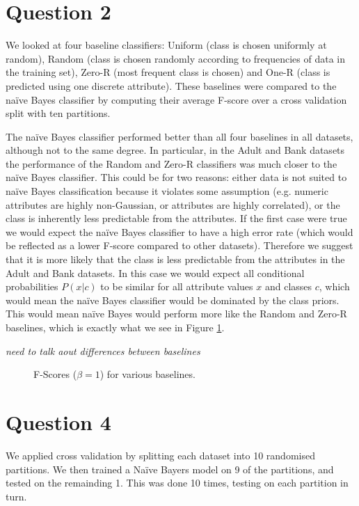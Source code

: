 \documentclass[11pt]{article}
\begin{document}
    \pagebreak
    \section*{Question 2}
    We looked at four baseline classifiers: Uniform (class is chosen uniformly at random), Random (class is chosen randomly according to frequencies of data in the training set), Zero-R (most frequent class is chosen) and One-R (class is predicted using one discrete attribute). These baselines were compared to the na\"{i}ve Bayes classifier by computing their average F-score over a cross validation split with ten partitions. 

    The na\"{i}ve Bayes classifier performed better than all four baselines in all datasets, although not to the same degree. In particular, in the Adult and Bank datasets the performance of the Random and Zero-R classifiers was much closer to the na\"{i}ve Bayes classifier. This could be for two reasons: either data is not suited to na\"{i}ve Bayes classification because it violates some assumption (e.g. numeric attributes are highly non-Gaussian, or attributes are highly correlated), or the class is inherently less predictable from the attributes. If the first case were true we would expect the na\"{i}ve Bayes classifier to have a high error rate (which would be reflected as a lower F-score compared to other datasets). Therefore we suggest that it is more likely that the class is less predictable from the attributes in the Adult and Bank datasets. In this case we would expect all conditional probabilities $P(x|c)$ to be similar for all attribute values $x$ and classes $c$, which would mean the na\"{i}ve Bayes classifier would be dominated by the class priors. This would mean na\"{i}ve Bayes would perform more like the Random and Zero-R baselines, which is exactly what we see in Figure \ref{fig:q2-baseline-fscores}.


    \textit{need to talk aout differences between baselines}

    \begin{figure}[H]
        \centering
        \def\svgwidth{\columnwidth}
        \fbox{\scalebox{0.5}{}}
        \caption{F-Scores ($\beta = 1$) for various baselines.}
        \label{fig:q2-baseline-fscores}
    \end{figure}

    \pagebreak
    \section*{Question 4}
    We applied cross validation by splitting each dataset into 10 randomised partitions. We then trained a Na\"{i}ve Bayers model on 9 of the partitions, and tested on the remainding 1. This was done 10 times, testing on each partition in turn.
\end{document}
